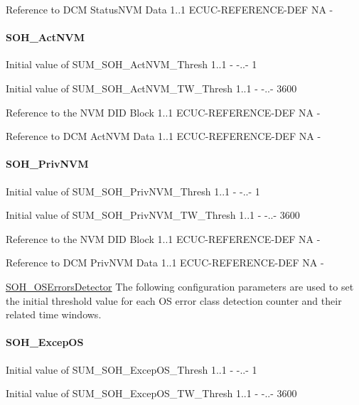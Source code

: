 {
{Reference to DCM StatusNVM Data}
{1..1}
{ECUC-REFERENCE-DEF}
{NA}
{-}}

\paragraph{SOH\_ActNVM}
{
{Initial value of SUM_SOH_ActNVM_Thresh}
{1..1}
{-}
{-..-}
{1}}

{
{Initial value of SUM_SOH_ActNVM_TW_Thresh}
{1..1}
{-}
{-..-}
{3600}}

{
{Reference to the NVM DID Block}
{1..1}
{ECUC-REFERENCE-DEF}
{NA}
{-}}

{
{Reference to DCM ActNVM Data}
{1..1}
{ECUC-REFERENCE-DEF}
{NA}
{-}}

\paragraph{SOH\_PrivNVM}
{
{Initial value of SUM_SOH_PrivNVM_Thresh}
{1..1}
{-}
{-..-}
{1}}

{
{Initial value of SUM_SOH_PrivNVM_TW_Thresh}
{1..1}
{-}
{-..-}
{3600}}

{
{Reference to the NVM DID Block}
{1..1}
{ECUC-REFERENCE-DEF}
{NA}
{-}}

{
{Reference to DCM PrivNVM Data}
{1..1}
{ECUC-REFERENCE-DEF}
{NA}
{-}}


\underline{SOH\_OSErrorsDetector}\newline
The following configuration parameters are used to set the initial threshold value for each OS error class detection counter and their related time windows.
\vspace*{0.1in}

\paragraph{SOH_ExcepOS}
{
{Initial value of SUM_SOH_ExcepOS_Thresh}
{1..1}
{-}
{-..-}
{1}}

{
{Initial value of SUM_SOH_ExcepOS_TW_Thresh}
{1..1}
{-}
{-..-}
{3600}}

